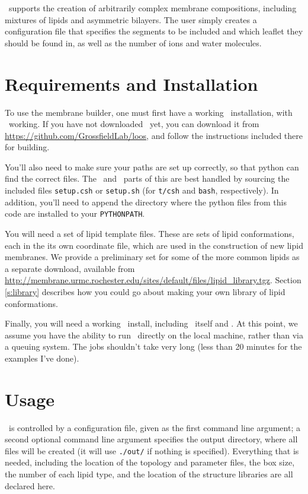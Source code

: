 \documentclass[12pt]{article}
\begin{document}
\omgwtf\ supports the creation of arbitrarily complex membrane compositions,
including mixtures of lipids and asymmetric bilayers.  The user simply
creates a configuration file that specifies the segments to be included and
which leaflet they should be found in, as well as the number of ions and
water molecules.

\section{Requirements and Installation}
\label{s:install}

To use the membrane builder, one must first have a working \loos\ installation,
with \pyloos\ working.  If you have not downloaded \loos\ yet, you can download
it from \url{https://github.com/GrossfieldLab/loos}, and follow the instructions
included there for building.

You'll also need to make sure your paths are set up correctly, so that python
can find the correct files.  The \loos\ and \pyloos\ parts of this are best
handled by sourcing the included files {\tt setup.csh} or {\tt setup.sh} (for
{\tt t/csh} and {\tt bash}, respectively).  In addition, you'll need to
append the directory where the python files from this code are installed to
your {\tt PYTHONPATH}.

You will need a set of lipid template files.  These are sets of
lipid conformations, each in the its own coordinate file, which are used in
the construction of new lipid membranes.  We provide a preliminary set for
some of the more common lipids as a separate download, available from
\url{http://membrane.urmc.rochester.edu/sites/default/files/lipid_library.tgz}.
  Section \ref{s:library} describes
how you could go about making your own library of lipid conformations.

Finally, you will need a working \namd\ install, including \namd\ itself and
\psfgen.  At this point, we assume you have the ability to run \namd\
directly on the local machine, rather than via a queuing system.  The jobs
shouldn't take very long (less than 20 minutes for the examples I've done).

\section{Usage}
\label{s:usage}

\omgwtf\ is controlled by a configuration file, given as the first command
line argument; a second optional command line argument specifies the output
directory, where all files will be created (it will use {\tt ./out/} if
nothing is specified).  Everything that is needed, including the location of
the topology and parameter files, the box size, the number of each lipid
type, and the location of the structure libraries are all declared here.
\end{document}
